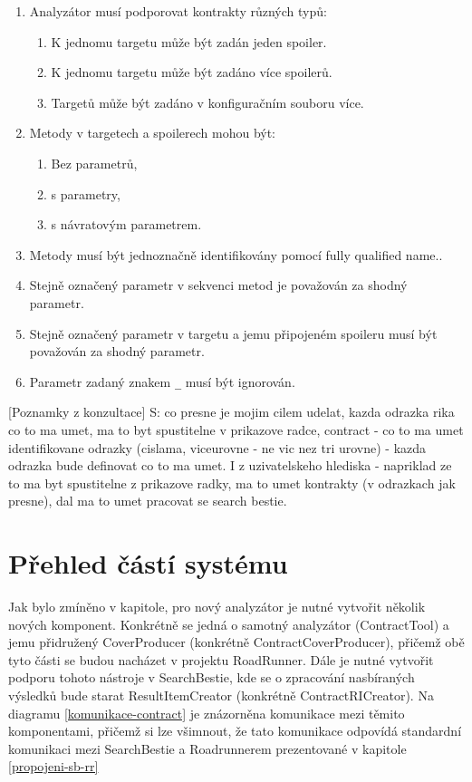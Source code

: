 \begin{enumerate}
\begin{enumerate}
	\item{Analyzátor musí podporovat kontrakty různých typů:
		\begin{enumerate}
			\item{K jednomu targetu může být zadán jeden spoiler.}
			\item{K jednomu targetu může být zadáno více spoilerů.}
			\item{Targetů může být zadáno v konfiguračním souboru více.}
		\end{enumerate}
	}
	\item{Metody v targetech a spoilerech mohou být:
		\begin{enumerate}
			\item{Bez parametrů,}
			\item{s parametry,}
			\item{s návratovým parametrem.}
		\end{enumerate}
	}
	\item{Metody musí být jednoznačně identifikovány pomocí fully qualified name..}
	\item{Stejně označený parametr v sekvenci metod je považován za shodný parametr.}
	\item{Stejně označený parametr v targetu a jemu připojeném spoileru musí být považován za shodný parametr.}
	\item{Parametr zadaný znakem \texttt{\_} musí být ignorován.}
\end{enumerate}

\end{enumerate}

[Poznamky z konzultace] S: co presne je mojim cilem udelat, kazda odrazka rika co to ma umet, ma to byt spustitelne v prikazove radce, contract - co to ma umet
identifikovane odrazky (cislama, viceurovne - ne vic nez tri urovne) - kazda odrazka bude definovat co to ma umet. I z uzivatelskeho hlediska - napriklad ze to ma byt spustitelne z prikazove radky, ma to umet kontrakty (v odrazkach jak presne), dal ma to umet pracovat se search bestie.


\section{Přehled částí systému}\label{prehled-casti-systemu}


Jak bylo zmíněno v kapitole, pro nový analyzátor je nutné vytvořit několik nových komponent. Konkrétně se jedná o samotný analyzátor (ContractTool) a jemu přidružený CoverProducer (konkrétně ContractCoverProducer), přičemž obě tyto části se budou nacházet v projektu RoadRunner. Dále je nutné vytvořit podporu tohoto nástroje v SearchBestie, kde se o zpracování nasbíraných výsledků bude starat ResultItemCreator (konkrétně ContractRICreator). Na diagramu \ref{komunikace-contract} je znázorněna komunikace mezi těmito komponentami, přičemž si lze všimnout, že tato komunikace odpovídá standardní komunikaci mezi SearchBestie a Roadrunnerem prezentované v kapitole \ref{propojeni-sb-rr}

